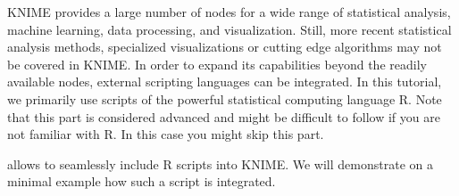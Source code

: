 KNIME provides a large number of nodes for a wide range of statistical analysis, machine learning, data processing, 
and visualization. Still, more recent statistical analysis methods, specialized visualizations or cutting edge 
algorithms may not be covered in KNIME. In order to expand its capabilities beyond the readily available nodes, 
external scripting languages can be integrated. In this tutorial, we primarily use scripts of the powerful 
statistical computing language R. Note that this part is considered advanced and might be difficult to follow if you 
are not familiar with R. In this case you might skip this part.

 allows to seamlessly include R scripts into KNIME. We will demonstrate on a minimal 
example how such a script is integrated.

